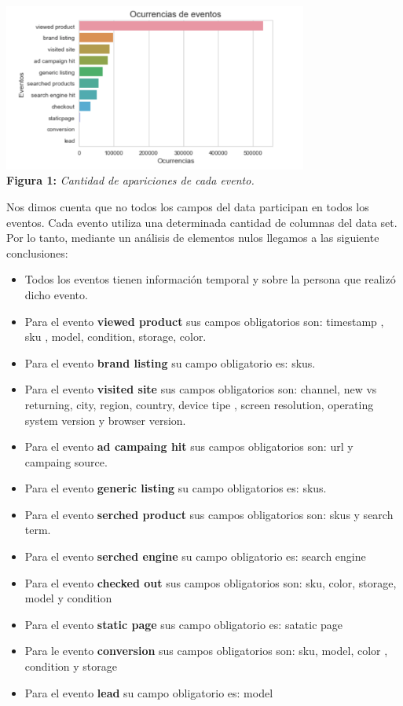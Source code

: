 \documentclass[titlepage,a4paper]{article}
\begin{document}
	\begin{center}
	\includegraphics[width=10cm]{ocurrencia_eventos.jpg}\\
	\textbf{Figura 1:}  \textit{Cantidad de apariciones de cada evento. }
	\end{center}
	
	Nos dimos cuenta que no todos los campos del data participan en todos los eventos. Cada evento utiliza una determinada cantidad de columnas del data set. Por lo tanto, mediante un análisis de elementos nulos llegamos a las siguiente conclusiones:
	\begin{itemize}
		\item Todos los eventos tienen información temporal y sobre la persona que realizó dicho evento. 
		\item Para el evento \textbf{viewed product} sus campos obligatorios son: timestamp , sku , model, condition, storage, color.
		\item Para el evento \textbf{brand listing} su campo obligatorio es: skus. 
		\item Para el evento \textbf{visited site} sus campos obligatorios son: channel, new vs returning, city, region, country, device tipe , screen resolution, operating system version y browser version.
		\item Para el evento \textbf{ad campaing hit} sus campos obligatorios son: url  y campaing source.
		\item Para el evento \textbf{generic listing} su campo obligatorios es: skus.
		\item Para el evento  \textbf{serched product } sus campos obligatorios son: skus y search term.
		\item Para el evento \textbf{serched engine} su campo obligatorio es: search engine
		\item Para el evento \textbf{checked out}  sus campos obligatorios son: sku, color, storage, model y condition 
		\item Para el evento \textbf{static page}  sus campo obligatorio es: satatic page
		\item Para le evento \textbf{conversion} sus campos obligatorios son:  sku, model, color , condition y storage
		\item Para el evento \textbf{lead} su campo obligatorio es: model
	\end{itemize}	
	
\end{document}
